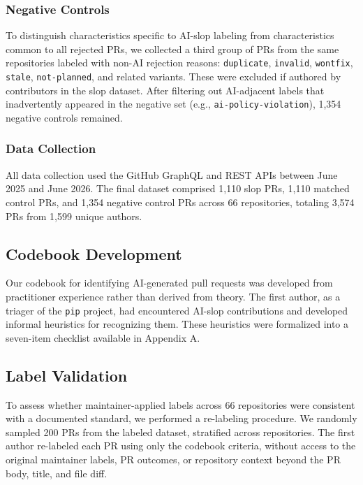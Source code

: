 \documentclass[11pt]{article}
\begin{document}
	\subsubsection{Negative Controls}
	
	To distinguish characteristics specific to AI-slop labeling from characteristics common to all rejected PRs, we collected a third group of PRs from the same repositories labeled with non-AI rejection reasons: \texttt{duplicate}, \texttt{invalid}, \texttt{wontfix}, \texttt{stale}, \texttt{not-planned}, and related variants. These were excluded if authored by contributors in the slop dataset. After filtering out AI-adjacent labels that inadvertently appeared in the negative set (e.g., \texttt{ai-policy-violation}), 1,354 negative controls remained.
	
	\subsubsection{Data Collection}
	
	All data collection used the GitHub GraphQL and REST APIs between June 2025 and June 2026.
	The final dataset comprised 1,110 slop PRs, 1,110 matched control PRs, and 1,354 negative control PRs across 66 repositories, totaling 3,574 PRs from 1,599 unique authors.
	
	\subsection{Codebook Development}
	
	Our codebook for identifying AI-generated pull requests was developed from practitioner experience rather than derived from theory. The first author, as a triager of the \texttt{pip} project, had encountered AI-slop contributions and developed informal heuristics for recognizing them. These heuristics were formalized into a seven-item checklist available in Appendix A.
	
	\subsection{Label Validation}
	
	To assess whether maintainer-applied labels across 66 repositories were consistent with a documented standard, we performed a re-labeling procedure. We randomly sampled 200 PRs from the labeled dataset, stratified across repositories. The first author re-labeled each PR using only the codebook criteria, without access to the original maintainer labels, PR outcomes, or repository context beyond the PR body, title, and file diff.
	
\end{document}
